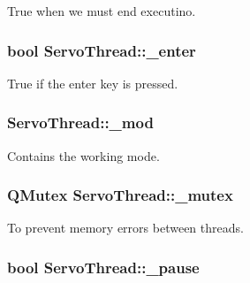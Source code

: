 True when we must end executino. 

\hypertarget{a00009_a5a3c1e2c09b76890790458b9d0469714}{}
\subsubsection[{\+\_\+enter}]{\setlength{\rightskip}{0pt plus 5cm}bool Servo\+Thread\+::\+\_\+enter\hspace{0.3cm}{\ttfamily [private]}}\label{a00009_a5a3c1e2c09b76890790458b9d0469714}


True if the enter key is pressed. 

\hypertarget{a00009_acdecea1688594d3ab7386a6db97dd90d}{}
\subsubsection[{\+\_\+mod}]{ Servo\+Thread\+::\+\_\+mod\hspace{0.3cm}{\ttfamily [private]}}\label{a00009_acdecea1688594d3ab7386a6db97dd90d}


Contains the working mode. 

\hypertarget{a00009_a6327eafc0dac189ec1b202d63ef32457}{}
\subsubsection[{\+\_\+mutex}]{\setlength{\rightskip}{0pt plus 5cm}Q\+Mutex Servo\+Thread\+::\+\_\+mutex\hspace{0.3cm}{\ttfamily [private]}}\label{a00009_a6327eafc0dac189ec1b202d63ef32457}


To prevent memory errors between threads. 

\hypertarget{a00009_aaf2ef80e8e43518b75d20a5102970d2e}{}
\subsubsection[{\+\_\+pause}]{\setlength{\rightskip}{0pt plus 5cm}bool Servo\+Thread\+::\+\_\+pause\hspace{0.3cm}{\ttfamily [private]}}\label{a00009_aaf2ef80e8e43518b75d20a5102970d2e}


